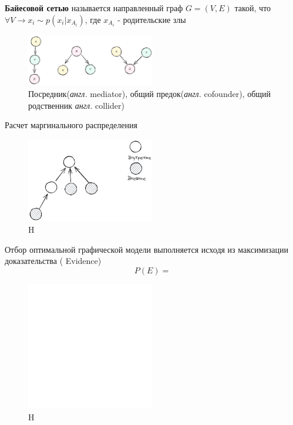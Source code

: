  

 \textbf{Байесовой сетью} называется направленный граф $G=(V,E)$ такой, что  
$\forall V \rightarrow x_i \sim p(x_i| x_{A_i})$, где $x_{A_i}$ - родительские злы 

\begin{figure}[h]
    \centering
    \includegraphics[width=0.5\textwidth]{assets/math/discrete/bayes_net.excalidraw.png}
    \caption{Посредник(\textit{англ.} mediator), общий предок(\textit{англ.} cofounder), 
 общий родственник \textit{англ.} collider) }
    \label{discr_vs_gen}
\end{figure}


Расчет маргинального распределения

\begin{figure}[h]
    \centering
    \includegraphics[width=0.5\textwidth]{assets/math/discrete/belief_propogation.excalidraw.png}
    \caption{H}
    \label{discr_vs_gen}
\end{figure}

Отбор оптимальной графической модели выполняется 
исходя из максимизации доказательства ( Evidence)
\begin{equation}
    P(E) = 
\end{equation}




\begin{figure}[h]
    \centering
    \includegraphics[width=0.5\textwidth]{assets/math/discrete/junction_tree.excalidraw.png}
    \caption{H}
    \label{discr_vs_gen}
\end{figure}


